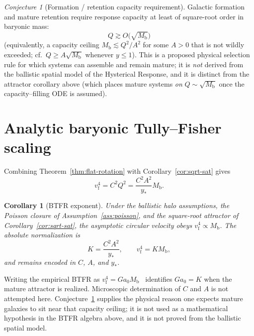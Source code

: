 \documentclass[11pt]{article}
\newtheorem{corollary}[theorem]{Corollary}
\theoremstyle{definition}
\theoremstyle{remark}
\newtheorem{conjecture}{Conjecture}
\newcommand{\Mb}{M_{\mathrm{b}}}
\newcommand{\vf}{v_{\mathrm{f}}}
\begin{document}
\begin{conjecture}[Formation / retention capacity requirement]
\label{conj:capacity}
Galactic formation and mature retention require response capacity at least of square-root order in baryonic mass:
\begin{equation}
  \boxed{Q\gtrsim O\bigl(\sqrt{\Mb}\bigr)}
\end{equation}
(equivalently, a capacity ceiling $\Mb\lesssim Q^{2}/A^{2}$ for some $A>0$ that is not wildly exceeded; cf.\ $Q\ge A\sqrt{\Mb}$ whenever $y\le1$).
This is a proposed physical selection rule for which systems can assemble and remain mature; it is \emph{not} derived from the ballistic spatial model of the Hysterical Response, and it is distinct from the attractor corollary above (which places mature systems \emph{on} $Q\sim\sqrt{\Mb}$ once the capacity--filling ODE is assumed).
\end{conjecture}

\section{Analytic baryonic Tully--Fisher scaling}
\label{sec:btfr}
Combining Theorem~\ref{thm:flat-rotation} with Corollary~\ref{cor:sqrt-sat} gives
\begin{equation}
  \vf^{4}=C^{2}Q^{2}=\frac{C^{2}A^{2}}{y_{\ast}}\Mb.
\end{equation}

\begin{corollary}[BTFR exponent]
\label{cor:btfr}
Under the ballistic halo assumptions, the Poisson closure of Assumption~\ref{ass:poisson}, and the square-root attractor of Corollary~\ref{cor:sqrt-sat}, the asymptotic circular velocity obeys $\vf^{4}\propto\Mb$.
The absolute normalization is
\begin{equation}
  K=\frac{C^{2}A^{2}}{y_{\ast}},
  \qquad\vf^{4}=K\Mb,
\end{equation}
and remains encoded in $C$, $A$, and $y_{\ast}$.
\end{corollary}

Writing the empirical BTFR as $\vf^{4}=Ga_{0}\Mb$~\cite{mcgaugh2012,lelli2016} identifies $Ga_{0}=K$ when the mature attractor is realized.
Microscopic determination of $C$ and $A$ is not attempted here.
Conjecture~\ref{conj:capacity} supplies the physical reason one expects mature galaxies to sit near that capacity ceiling; it is not used as a mathematical hypothesis in the BTFR algebra above, and it is not proved from the ballistic spatial model.
\end{document}
